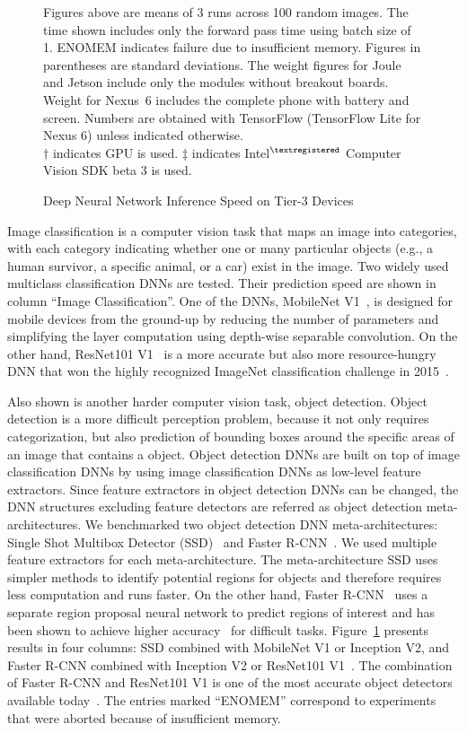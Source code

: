 \begin{figure}
\begin{captiontext}
Figures above are means of 3 runs across 100 random images. The time shown
includes only the forward pass time using batch size of 1. ENOMEM indicates
failure due to insufficient memory. Figures in parentheses are standard
deviations. The weight figures for Joule and Jetson include only the modules
without breakout boards. Weight for Nexus~6 includes the complete phone with
battery and screen. Numbers are obtained with TensorFlow (TensorFlow Lite for
Nexus 6) unless indicated otherwise. \\
$\dagger$ indicates GPU is used. $\ddagger$ indicates
Intel$^{\tiny\textregistered}$ Computer Vision SDK beta 3 is used.
\end{captiontext}
\caption{Deep Neural Network Inference Speed on Tier-3 Devices}
\label{fig:onboard-dnn-speed}
\end{figure}

Image classification is a computer vision task that maps an image into
categories, with each category indicating whether one or many particular objects
(e.g., a human survivor, a specific animal, or a car) exist in the image. Two
widely used multiclass classification DNNs are tested. Their prediction speed
are shown in column ``Image Classification''. One of the DNNs, MobileNet
V1~\cite{Howard2017}, is designed for mobile devices from the ground-up by
reducing the number of parameters and simplifying the layer computation using
depth-wise separable convolution. On the other hand, ResNet101 V1~\cite{He2016}
is a more accurate but also more resource-hungry DNN that won the highly
recognized ImageNet classification challenge in 2015~\cite{Russakovsky15}. 

Also shown is another harder computer vision task, object detection. Object
detection is a more difficult perception problem, because it not only requires
categorization, but also prediction of bounding boxes around the specific areas
of an image that contains a object. Object detection DNNs
are built on top of image classification DNNs by using image classification DNNs
as low-level feature extractors. Since feature extractors in object detection
DNNs can be changed, the DNN structures excluding feature detectors are referred
as object detection meta-architectures. We benchmarked two object detection DNN
meta-architectures: Single Shot Multibox Detector (SSD)~\cite{Liu2016} and
Faster R-CNN~\cite{Ren2015}. We used multiple feature extractors for each
meta-architecture. The meta-architecture SSD uses simpler methods to identify
potential regions for objects and therefore requires less computation and runs
faster. On the other hand, Faster R-CNN~\cite{Ren2015} uses a separate region
proposal neural network to predict regions of interest and has been shown to
achieve higher accuracy~\cite{Huang2017} for difficult tasks.
Figure~\ref{fig:onboard-dnn-speed} presents results in four columns: SSD
combined with MobileNet V1 or Inception V2, and Faster R-CNN combined with
Inception V2 or ResNet101 V1~\cite{He2016}. The combination of Faster R-CNN and
ResNet101 V1 is one of the most accurate object detectors available
today~\cite{Russakovsky15}. The entries marked ``{\sc ENOMEM}'' correspond to
experiments that were aborted because of insufficient memory.

